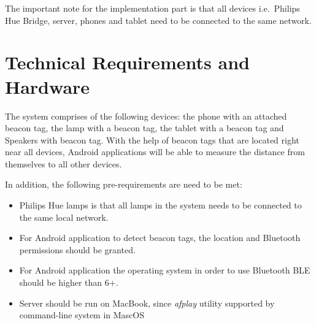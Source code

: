 The important note for the implementation part is that all devices i.e.\ Philips Hue Bridge, server, phones and tablet
need to be connected to the same network.


\section{Technical Requirements and Hardware}
\label{sec:technical-requirements-and-hardware}
The system comprises of the following devices: the phone with an attached beacon tag,
the lamp with a beacon tag, the tablet with a beacon tag and Speakers with beacon tag.
With the help of beacon tags that are located right near all devices, Android applications
will be able to measure the distance from themselves to all other devices.

In addition, the following pre-requirements are need to be met:
\begin{itemize}
    \item Philips Hue lamps is that all lamps in the system needs to be connected to the same local network.
    \item For Android application to detect beacon tags, the location and Bluetooth permissions should be granted.
    \item For Android application the operating system in order to use Bluetooth BLE should be higher than 6+.
    \item Server should be run on MacBook, since \emph{afplay} utility supported by command-line system in MascOS
\end{itemize}



